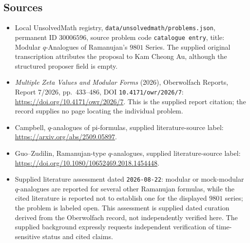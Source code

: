 \documentclass[11pt]{article}
\begin{document}
\subsection{Sources}
\begin{itemize}
\item Local UnsolvedMath registry, \texttt{data/unsolvedmath/problems.json}, permanent ID \(30006596\), source problem code \texttt{catalogue entry}, title: Modular \(q\)-Analogues of Ramanujan's \(9801\) Series. The supplied original transcription attributes the proposal to Kam Cheong Au, although the structured proposer field is empty.
\item \emph{Multiple Zeta Values and Modular Forms} (2026), Oberwolfach Reports, Report 7/2026, pp.\ 433--486, DOI \texttt{10.4171/owr/2026/7}: \url{https://doi.org/10.4171/owr/2026/7}. This is the supplied report citation; the record supplies no page locating the individual problem.
\item Campbell, \(q\)-analogues of pi-formulas, supplied literature-source label: \url{https://arxiv.org/abs/2509.05897}.
\item Guo--Zudilin, Ramanujan-type \(q\)-analogues, supplied literature-source label: \url{https://doi.org/10.1080/10652469.2018.1454448}.
\item Supplied literature assessment dated \texttt{2026-08-22}: modular or mock-modular \(q\)-analogues are reported for several other Ramanujan formulas, while the cited literature is reported not to establish one for the displayed \(9801\) series; the problem is labeled open. This assessment is supplied dated curation derived from the Oberwolfach record, not independently verified here. The supplied background expressly requests independent verification of time-sensitive status and cited claims.
\end{itemize}
\end{document}
